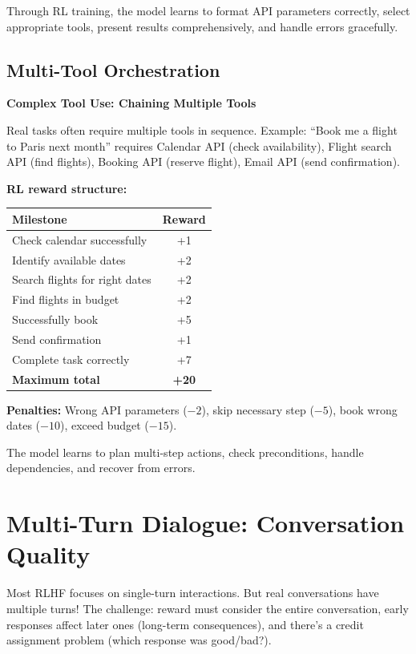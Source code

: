 \begin{chapterenv}
Through RL training, the model learns to format API parameters correctly, select appropriate tools, present results comprehensively, and handle errors gracefully.

\subsection{Multi-Tool Orchestration}

\begin{infobox}
\textbf{Complex Tool Use: Chaining Multiple Tools}

Real tasks often require multiple tools in sequence. Example: ``Book me a flight to Paris next month'' requires Calendar API (check availability), Flight search API (find flights), Booking API (reserve flight), Email API (send confirmation).

\textbf{RL reward structure:}

\begin{center}
\begin{tabular}{lc}
\toprule
\textbf{Milestone} & \textbf{Reward} \\
\midrule
Check calendar successfully & +1 \\
Identify available dates & +2 \\
Search flights for right dates & +2 \\
Find flights in budget & +2 \\
Successfully book & +5 \\
Send confirmation & +1 \\
Complete task correctly & +7 \\
\midrule
\textbf{Maximum total} & \textbf{+20} \\
\bottomrule
\end{tabular}
\end{center}

\textbf{Penalties:} Wrong API parameters ($-2$), skip necessary step ($-5$), book wrong dates ($-10$), exceed budget ($-15$).

The model learns to plan multi-step actions, check preconditions, handle dependencies, and recover from errors.
\end{infobox}

\section{Multi-Turn Dialogue: Conversation Quality}

Most RLHF focuses on single-turn interactions. But real conversations have multiple turns! The challenge: reward must consider the entire conversation, early responses affect later ones (long-term consequences), and there's a credit assignment problem (which response was good/bad?).


\end{chapterenv}
